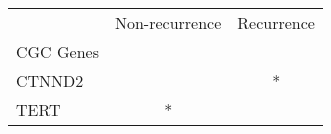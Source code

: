 \begin{tabular}{lcc}
\toprule
{} & Non-recurrence & Recurrence \\
CGC Genes &                &            \\
\midrule
CTNND2    &                &          * \\
TERT      &              * &            \\
\bottomrule
\end{tabular}
